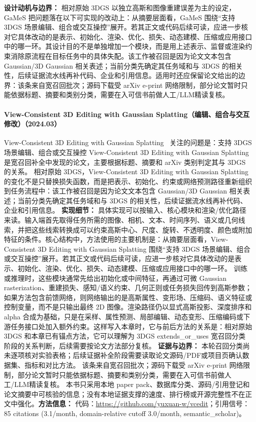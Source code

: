 \textbf{设计动机与边界：} 相对原始 3DGS 以独立高斯和图像重建误差为主的设定，GaMeS 把问题落在以下可实现的改动上：从摘要层面看，GaMeS 围绕“支持 3DGS 场景编辑、组合或交互操控”展开。若其正文或代码后续可读，应进一步核对它具体改动的是表示、初始化、渲染、优化、损失、动态建模、压缩或应用接口中的哪一环。其设计目的不是单独增加一个模块，而是用上述表示、监督或渲染约束消除原流程在目标任务中的具体失配。该工作被召回是因为论文文本包含 Gaussian/3D Gaussian 相关表述；当前分类先确定其任务域和与 3DGS 的相关性，后续证据流水线再补代码、企业和引用信息。适用时还应保留论文给出的边界：该条来自宽召回批次；源码下载受 arXiv e-print 网络限制，部分论文暂时只能依据标题、摘要和类别分类，需要在入可信书前做人工/LLM精读复核。
\paragraph{View-Consistent 3D Editing with Gaussian Splatting（编辑、组合与交互修改）（2024.03）}
View-Consistent 3D Editing with Gaussian Splatting~\cite{2403_11868} 关注的问题是：支持 3DGS 场景编辑、组合或交互操控 View-Consistent 3D Editing with Gaussian Splatting 是宽召回补全中发现的论文，主要根据标题、摘要和 arXiv 类别判定其与 3DGS 的关系。
相对原始 3DGS，View-Consistent 3D Editing with Gaussian Splatting 的变化不是只替换损失函数，而是把表示、初始化、约束或网络预测路径重新组织到任务流程中：该工作被召回是因为论文文本包含 Gaussian/3D Gaussian 相关表述；当前分类先确定其任务域和与 3DGS 的相关性，后续证据流水线再补代码、企业和引用信息。
\textbf{实现细节：} 具体实现可以按输入、核心模块和渲染/优化路径来读。输入端首先取得任务所需的图像、相机、文本、时间序列、语义或几何线索，并把这些线索转换成可以约束高斯中心、尺度、旋转、不透明度、颜色或附加特征的条件。核心结构中，方法使用的主要机制是：从摘要层面看，View-Consistent 3D Editing with Gaussian Splatting 围绕“支持 3DGS 场景编辑、组合或交互操控”展开。若其正文或代码后续可读，应进一步核对它具体改动的是表示、初始化、渲染、优化、损失、动态建模、压缩或应用接口中的哪一环。 训练或推理时，这些模块通常先给出初始化或中间特征，再通过可微 Gaussian rasterization、重建损失、感知/语义约束、几何正则或任务损失回传到高斯参数；如果方法包含前馈网络，则网络输出的是高斯属性、变形场、压缩码、语义特征或控制变量，而不是只输出最终 2D 图像。渲染路径仍以显式高斯投影、深度排序和 alpha 合成为基础，只是在采样、属性预测、局部编辑、动态变形、压缩编码或下游任务接口处加入额外约束。这样写入本章时，它与前后方法的关系是：相对原始 3DGS 和本章已有锚点方法，它可以理解为 3DGS extends\_or\_uses 宽召回分类阶段的关系判断，后续需要按论文方法部分复核。
\textbf{证据与边界：} 本轮召回分类尚未逐项核对实验表格；后续证据补全阶段需要读取论文源码/PDF或项目页确认数据集、指标和对比方法。 该条来自宽召回批次；源码下载受 arXiv e-print 网络限制，部分论文暂时只能依据标题、摘要和类别分类，需要在入可信书前做人工/LLM精读复核。 本书只采用本地 paper pack、数据库分类、源码/引用登记和论文摘要中可核验的信息；没有本地证据支撑的速度、排行榜或开源完整性不在正文中强化。\textbf{方法信息：} 代码：\url{https://github.com/yuxuan-w/vcedit}；引用信号：85 citations (3.1/month, domain-relative cutoff 3.0/month, semantic\_scholar)。
